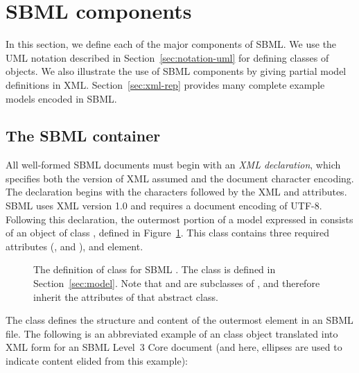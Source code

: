 
\section{SBML components}
\label{sec:elements}

In this section, we define each of the major components of SBML.
We use the UML notation described in
Section~\ref{sec:notation-uml} for defining classes of objects.
We also illustrate the use of SBML components by giving partial
model definitions in XML.  Section~\ref{sec:xml-rep} provides many
complete example models encoded in SBML.


\subsection{The SBML container}
\label{sec:sbml}

All well-formed SBML documents must begin with an \emph{XML
  declaration}, which specifies both the version of XML assumed
and the document character encoding.  The declaration begins with
the characters  followed by the XML 
and  attributes.  SBML \thisL uses XML version 1.0
and requires a document encoding of UTF-8.  Following this
declaration, the outermost portion of a model expressed in \thisL
consists of an object of class \SBML, defined in
Figure~\ref{fig:sbml}.  This class contains three required
attributes (,  and ), and
  element.

\begin{figure}[htb]
  \centering
  \small
  \vspace{1.5ex}
  \caption{The definition of class \SBML for SBML \thisLV.  The
    class \Model is defined in Section~\ref{sec:model}.  Note that
    \SBML and \Model are subclasses of \SBaseUpright, and therefore
    inherit the attributes of that abstract class.}
  \label{fig:sbml}
\end{figure}

The \SBML class defines the structure and content of the
 outermost element in an SBML file.  The following is
an abbreviated example of an \SBML class object translated into
XML form for an SBML Level~3  Core document (and here,
ellipses are used to indicate content elided from this example):

